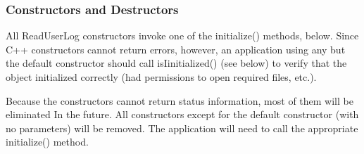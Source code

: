 \subsubsection{Constructors and Destructors}
All ReadUserLog constructors invoke one of the initialize() methods,
below.  Since C++ constructors cannot return errors, however, an
application using any but the default constructor should call
isIinitialized() (see below) to verify that the object initialized
correctly (had permissions to open required files, etc.).

\Note Because the constructors cannot return status information, most of
them will be eliminated In the future.  All constructors except for
the default constructor (with no parameters) will be removed.
The application will need to call the appropriate initialize() method.

